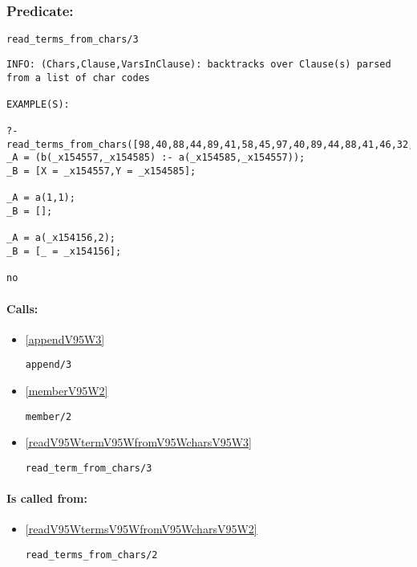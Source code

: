 \subsubsection{Predicate:} \label{readV95WtermsV95WfromV95WcharsV95W3}

\begin{verbatim}
read_terms_from_chars/3
\end{verbatim}

{\small \begin{verbatim}
INFO: (Chars,Clause,VarsInClause): backtracks over Clause(s) parsed from a list of char codes

EXAMPLE(S):

?-read_terms_from_chars([98,40,88,44,89,41,58,45,97,40,89,44,88,41,46,32,97,40,49,44,49,41,46,32,97,40,95,44,50,41,46,32],_A,_B).
_A = (b(_x154557,_x154585) :- a(_x154585,_x154557));
_B = [X = _x154557,Y = _x154585];

_A = a(1,1);
_B = [];

_A = a(_x154156,2);
_B = [_ = _x154156];

no

\end{verbatim}}
\paragraph{Calls:} 
\begin{itemize}
\item \ref{appendV95W3} 
\begin{verbatim}
append/3
\end{verbatim}

\item \ref{memberV95W2} 
\begin{verbatim}
member/2
\end{verbatim}

\item \ref{readV95WtermV95WfromV95WcharsV95W3} 
\begin{verbatim}
read_term_from_chars/3
\end{verbatim}

\end{itemize}
\paragraph{Is called from:} 
\begin{itemize}
\item \ref{readV95WtermsV95WfromV95WcharsV95W2} 
\begin{verbatim}
read_terms_from_chars/2
\end{verbatim}

\end{itemize}

